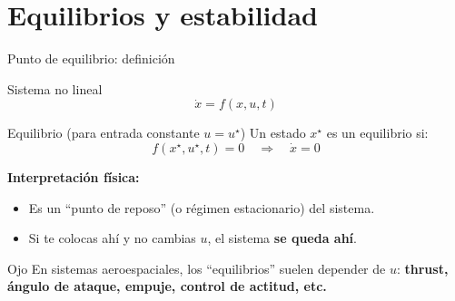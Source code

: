 \documentclass[aspectratio=169,10pt]{beamer}
\newcommand{\importantbox}[2][Importante]{%
\begin{alertblock}{#1}#2\end{alertblock}}
\begin{document}
\section{Equilibrios y estabilidad}

\begin{frame}{Punto de equilibrio: definición}
\small

\begin{block}{Sistema no lineal}
\[
\dot{x}=f(x,u,t)
\]
\end{block}

\begin{block}{Equilibrio (para entrada constante $u=u^\star$)}
Un estado $x^\star$ es un equilibrio si:
\[
f(x^\star,u^\star,t)=0 \quad \Rightarrow \quad \dot{x}=0
\]
\end{block}

\vspace{2mm}
\textbf{Interpretación física:}
\begin{itemize}
\item Es un ``punto de reposo'' (o régimen estacionario) del sistema.
\item Si te colocas ahí y no cambias $u$, el sistema \textbf{se queda ahí}.
\end{itemize}

\importantbox[Ojo]{
En sistemas aeroespaciales, los ``equilibrios'' suelen depender de $u$:
\textbf{thrust, ángulo de ataque, empuje, control de actitud, etc.}
}

\end{frame}
\end{document}
